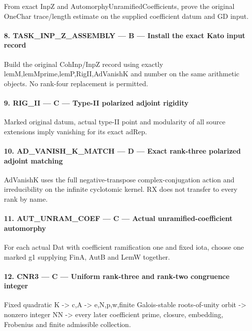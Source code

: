 From exact InpZ and AutomorphyUnramifiedCoefficients, prove the original OneChar trace/\allowbreak{}length estimate on the supplied coefficient datum and GD input.

\paragraph{8. TASK\_\allowbreak{}INP\_\allowbreak{}Z\_\allowbreak{}ASSEMBLY — B — Install the exact Kato input record}

Build the original CohInp/\allowbreak{}InpZ record using exactly lemM,lemMprime,lemP,RigII,AdVanishK and number on the same arithmetic objects. No rank-four replacement is permitted.

\paragraph{9. RIG\_\allowbreak{}II — C — Type-II polarized adjoint rigidity}

Marked original datum, actual type-II point and modularity of all source extensions imply vanishing for its exact adRep.

\paragraph{10. AD\_\allowbreak{}VANISH\_\allowbreak{}K\_\allowbreak{}MATCH — D — Exact rank-three polarized adjoint matching}

AdVanishK uses the full negative-transpose complex-conjugation action and irreducibility on the infinite cyclotomic kernel. RX does not transfer to every rank by name.

\paragraph{11. AUT\_\allowbreak{}UNRAM\_\allowbreak{}COEF — C — Actual unramified-coefficient automorphy}

For each actual Dat with coefficient ramification one and fixed iota, choose one marked g1 supplying FinA, AutB and LemW together.

\paragraph{12. CNR3 — C — Uniform rank-three and rank-two congruence integer}

Fixed quadratic K -> c,A -> e,N,p,w,finite Galois-stable roots-of-unity orbit -> nonzero integer NN -> every later coefficient prime, closure, embedding, Frobenius and finite admissible collection.

